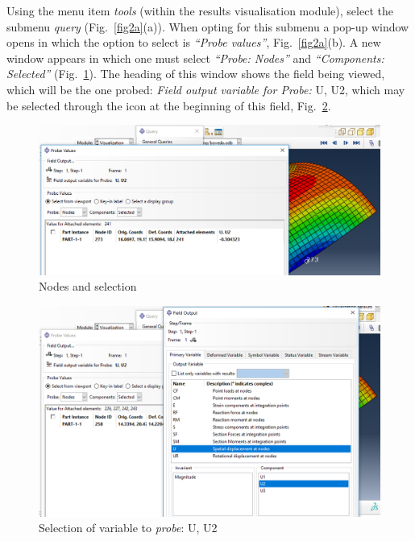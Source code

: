 \documentclass[english,a4paper,12pt]{article}
\begin{document}
Using the menu item \emph{tools} (within the results visualisation module), select the submenu \emph{query}  (Fig.~\ref{fig2a}(a)). When opting for this submenu a pop-up window opens in which the option to select is \emph{``Probe values''},
Fig.~\ref{fig2a}(b).
A new window appears in which one must select \emph{``Probe: Nodes''} and \emph{``Components: Selected''} (Fig.~\ref{fig5}).
The heading of this window shows the field being viewed, which will be the one probed: \emph{Field output variable for Probe:} U, U2, which may be selected through the icon at the beginning of this field,
Fig.~\ref{fig7}.
\begin{figure}[h!tp]
\centering
	\includegraphics[scale=0.45]{capturas2019/a_fig32.png}
  \caption{Nodes and selection}
  \label{fig5}
\end{figure}
\begin{figure}[h!tp]
\centering
	\includegraphics[scale=0.45]{capturas2019/a_fig33.png}
  \caption{Selection of variable to \emph{probe}: U, U2}
  \label{fig7}
\end{figure}
\end{document}
